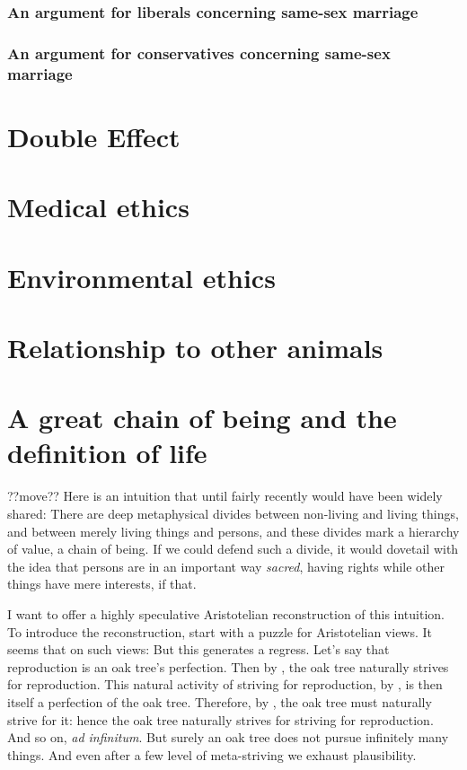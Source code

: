 \subsubsection{An argument for liberals concerning same-sex marriage}

\subsubsection{An argument for conservatives concerning same-sex marriage}

\section{Double Effect}
\section{Medical ethics}
\section{Environmental ethics}
\section{Relationship to other animals}
\section{A great chain of being and the definition of life}??move??
Here is an intuition that until fairly recently would have been widely shared: There are deep metaphysical divides between non-living and living things, 
and between merely living things and persons, and these divides mark a hierarchy of value, a chain of being. If we could defend such a divide, it would 
dovetail with the idea that persons are in an important way \textit{sacred}, having rights while other things have mere interests, if that. 

I want to offer a highly speculative Aristotelian reconstruction of this intuition. To introduce the reconstruction, start with a puzzle for
Aristotelian views. It seems that on such views:
But this generates a regress. Let's say that reproduction is an oak tree's perfection. Then by , the oak tree naturally strives for 
reproduction. This natural activity of striving for reproduction, by , is then itself a perfection of the oak tree. Therefore,
by , the oak tree must naturally strive for it: hence the oak tree naturally strives for striving for reproduction. And so on,
\textit{ad infinitum}. But surely an oak tree does not pursue infinitely many things. And even after a few level of meta-striving we exhaust plausibility.

